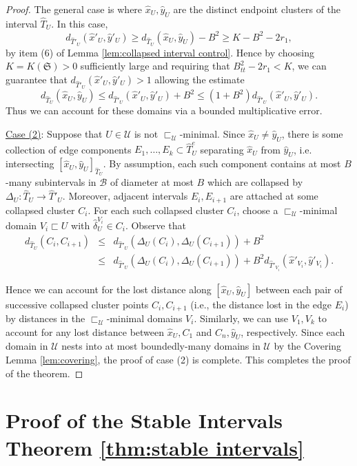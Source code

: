 \documentclass{amsart}
\theoremstyle{definition}
\theoremstyle{remark}
\theoremstyle{definition}
\newcommand{\calB}{\mathcal{B}}
\newcommand{\calU}{\mathcal{U}}
\newcommand{\hT}{\widehat{T}}
\newcommand{\hx}{\hat{x}}
\newcommand{\hy}{\hat{y}}
\newcommand{\hd}{\hat{\delta}}
\newcommand{\nest}{\sqsubset}
\begin{document}
\begin{proof}
The general case is where $\hx_U, \hy_U$ are the distinct endpoint clusters of the interval $\hT_U$.  In this case, 
$$d_{\hT'_U}(\hx'_U,\hy'_U)  \geq d_{\hT_U}(\hx_U,\hy_U) - B^2 \geq K - B^2 - 2r_1,$$ by item (6) of Lemma \ref{lem:collapsed interval control}.   Hence by choosing $K = K(\mathfrak S)>0$ sufficiently large and requiring that $B^2_{tt}-2r_1<K$, we can guarantee that $d_{\hT'_U}(\hx'_U,\hy'_U) >1$ allowing the estimate
$$d_{\hT_U}(\hx_U,\hy_U) \leq d_{\hT'_U}(\hx'_U,\hy'_U) + B^2 \leq (1+B^2)d_{\hT'_U}(\hx'_U,\hy'_U).$$
Thus we can account for these domains via a bounded multiplicative error.


\smallskip
\underline{Case (2)}:  Suppose that $U \in \calU$ is not $\nest_{\calU}$-minimal.  Since $\hx_U \neq \hy_U$, there is some collection of edge components $E_1, \dots, E_k\subset \hT^e_U$ separating $\hx_U$ from $\hy_U$, i.e. intersecting $[\hx_U, \hy_U]_{\hT_U}$.  By assumption, each such component contains at most $B$-many subintervals in $\calB$ of diameter at most $B$ which are collapsed by $\Delta_U:\hT_U \to \hT'_U$.  Moreover, adjacent intervals $E_i, E_{i+1}$ are attached at some collapsed cluster $C_i$.  For each such collapsed cluster $C_i$, choose a $\nest_{\calU}$-minimal domain $V_i \nest U$ with $\hd^{V_i}_U \in C_i$.  Observe that
\begin{eqnarray*}
d_{\hT_U}(C_i,C_{i+1}) &\leq& d_{\hT'_U}(\Delta_U(C_i), \Delta_U(C_{i+1})) + B^2\\
&\leq& d_{\hT'_U}(\Delta_U(C_i), \Delta_U(C_{i+1})) + B^2d_{\hT'_{V_i}}(\hx'_{V_i}, \hy'_{V_i}).
\end{eqnarray*}

Hence we can account for the lost distance along $[\hx_U, \hy_U]$ between each pair of successive collapsed cluster points $C_i, C_{i+1}$ (i.e., the distance lost in the edge $E_i$) by distances in the $\nest_{\calU}$-minimal domains $V_i$.  Similarly, we can use $V_1, V_k$ to account for any lost distance between $\hx_U, C_1$ and $C_n, \hy_U$, respectively.  Since each domain in $\calU$ nests into at most boundedly-many domains in $\calU$ by the Covering Lemma \ref{lem:covering}, the proof of case (2) is complete.  This completes the proof of the theorem.
\end{proof}




\section{Proof of the Stable Intervals Theorem \ref{thm:stable intervals}} \label{app:SI}
\end{document}
